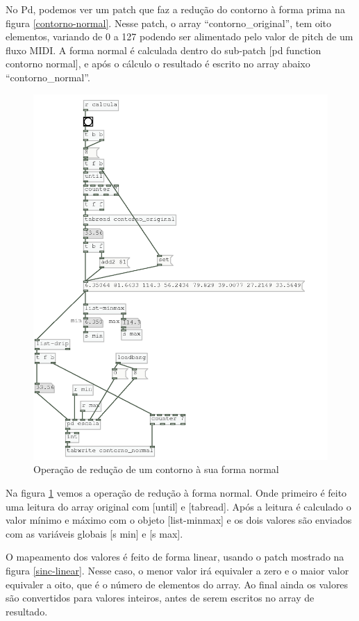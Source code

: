 \documentclass{ppgmus}
\begin{document}
No Pd, podemos ver um patch que faz a redução do contorno à forma prima 
na figura \ref{contorno-normal}. Nesse patch, o array ``contorno\_original'',
tem oito elementos, variando de 0 a 127 podendo ser alimentado pelo valor de pitch de um fluxo
MIDI. A forma normal é calculada dentro do sub-patch [pd function contorno normal], e após
o cálculo o resultado é escrito no array abaixo ``contorno\_normal''.

\begin{figure}
\includegraphics[scale=.6]{func-contorno-normal}
\caption{Operação de redução de um contorno à sua forma normal}
\label{func-contorno-normal}
\end{figure}

Na figura \ref{func-contorno-normal} vemos a operação de redução à forma normal.
Onde primeiro é feito uma leitura do array original com [until] e [tabread]. Após
a leitura é calculado o valor mínimo e máximo com o objeto [list-minmax] e os dois
valores são enviados com as variáveis globais [s min] e [s max].

O mapeamento dos valores é feito de forma linear, usando o patch mostrado na figura \ref{sinc-linear}.
Nesse caso, o menor valor irá equivaler a zero e o maior valor equivaler a oito, que é o
número de elementos do array. Ao final ainda os valores são convertidos para valores inteiros,
antes de serem escritos no array de resultado.
\end{document}
